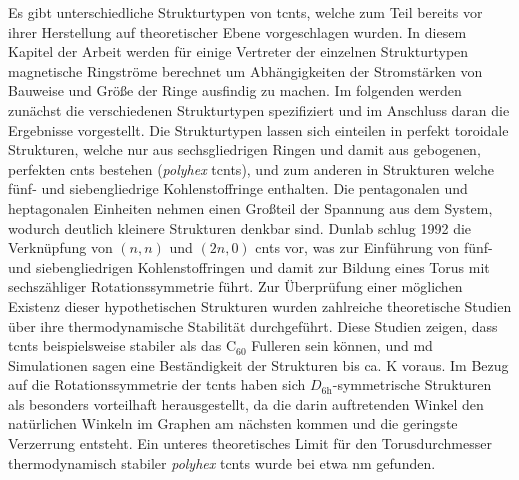 Es gibt unterschiedliche Strukturtypen von \acp{tcnt}, welche zum Teil bereits vor ihrer Herstellung auf theoretischer Ebene vorgeschlagen wurden. In diesem Kapitel der Arbeit werden für einige Vertreter der einzelnen Strukturtypen magnetische Ringströme berechnet um Abhängigkeiten der Stromstärken von Bauweise und Größe der Ringe ausfindig zu machen. Im folgenden werden zunächst die verschiedenen Strukturtypen spezifiziert und im Anschluss daran die Ergebnisse vorgestellt.   
Die Strukturtypen lassen sich einteilen in perfekt toroidale Strukturen, welche nur aus sechsgliedrigen Ringen und damit aus gebogenen, perfekten \acp{cnt} bestehen (\textit{polyhex} \acp{tcnt}), und zum anderen in Strukturen welche fünf- und siebengliedrige Kohlenstoffringe enthalten. Die pentagonalen und heptagonalen Einheiten nehmen einen Großteil der Spannung aus dem System, wodurch deutlich kleinere Strukturen denkbar sind. Dunlab\supercite{dunlap1992connecting} schlug 1992 die Verknüpfung von $(n,n)$ und $(2n,0)$ \acp{cnt} vor, was zur Einführung von fünf- und siebengliedrigen Kohlenstoffringen und damit zur Bildung eines Torus mit sechszähliger Rotationssymmetrie führt. Zur Überprüfung einer möglichen Existenz dieser hypothetischen Strukturen wurden zahlreiche theoretische Studien über ihre thermodynamische Stabilität durchgeführt. Diese Studien zeigen, dass \acp{tcnt} beispielsweise stabiler als das C$_{60}$ Fulleren\supercite{dunlap1992connecting,itoh1993toroidal,ihara1993toroidal,itoh1993toroidal2} sein können, und \ac{md} Simulationen\supercite{itoh1993toroidal,hod2003carbon,tacsci2005stability,chen2011thermal} sagen eine Beständigkeit der Strukturen bis ca. \unit[2000]{K} voraus. Im Bezug auf die Rotationssymmetrie der \acp{tcnt} haben sich $D_{\text{6h}}$-symmetrische Strukturen als besonders vorteilhaft herausgestellt\supercite{liu2011structure,ihara1995helically}, da die darin auftretenden Winkel den natürlichen Winkeln im Graphen am nächsten kommen und die geringste Verzerrung entsteht. Ein unteres theoretisches Limit für den Torusdurchmesser thermodynamisch stabiler \textit{polyhex} \acp{tcnt} wurde bei etwa \unit[200]{nm} gefunden.\supercite{meunier1998atomic}\\

